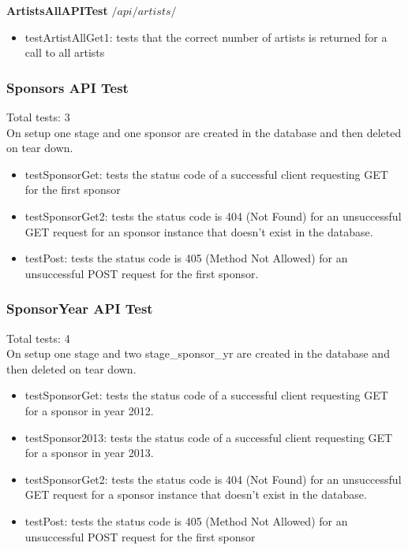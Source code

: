 \documentclass[12pt,english]{scrartcl}
\begin{document}
{\bf ArtistsAllAPITest}
$/api/artists/$
\begin{itemize}
 \item testArtistAllGet1: tests that the correct number of artists is returned for a call to all artists
\end{itemize}

\subsubsection{Sponsors API Test}
Total tests: 3\\
On setup one stage and one sponsor are created in the database and then deleted on tear down.
\begin{itemize}
 \item testSponsorGet: tests the status code of a successful client requesting GET for the first sponsor
 
 \item testSponsorGet2: tests the status code is 404 (Not Found) for an unsuccessful GET request for an sponsor instance
 that doesn't exist in the database.
 
 \item testPost: tests the status code is 405 (Method Not Allowed) for an unsuccessful POST request for the first sponsor.
\end{itemize}

\subsubsection{SponsorYear API Test}
Total tests: 4\\
On setup one stage and two stage\_sponsor\_yr are created in the database and then deleted on tear down.
\begin{itemize}
 \item testSponsorGet: tests the status code of a successful client requesting GET for a sponsor in year 2012.
 
 \item testSponsor2013: tests the status code of a successful client requesting GET for a sponsor in year 2013.
 
 \item testSponsorGet2: tests the status code is 404 (Not Found) for an unsuccessful GET request for a sponsor instance
 that doesn't exist in the database.
 
 \item testPost: tests the status code is 405 (Method Not Allowed) for an unsuccessful POST request for the first sponsor
 \end{itemize}
 
\end{document}
